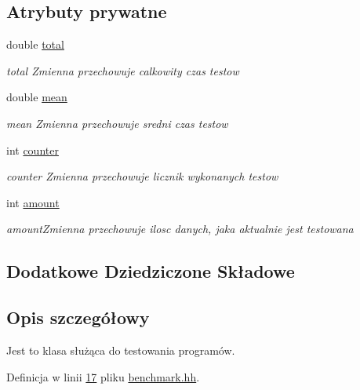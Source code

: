 \subsection*{Atrybuty prywatne}
\begin{DoxyCompactItemize}
\item 
double \hyperlink{class_benchmark_a7130c0718e3a3ab2fea70285dab122a2}{total}
\begin{DoxyCompactList}\small\item\em total Zmienna przechowuje calkowity czas testow \end{DoxyCompactList}\item 
double \hyperlink{class_benchmark_aa88092b6164ad7d1243162d3012f729a}{mean}
\begin{DoxyCompactList}\small\item\em mean Zmienna przechowuje sredni czas testow \end{DoxyCompactList}\item 
int \hyperlink{class_benchmark_a3a56c7dad0b21e490f3024d5d0027f31}{counter}
\begin{DoxyCompactList}\small\item\em counter Zmienna przechowuje licznik wykonanych testow \end{DoxyCompactList}\item 
int \hyperlink{class_benchmark_a1d0eaa6febe9b7a7f5f5147e83f60910}{amount}
\begin{DoxyCompactList}\small\item\em amount\-Zmienna przechowuje ilosc danych, jaka aktualnie jest testowana \end{DoxyCompactList}\end{DoxyCompactItemize}
\subsection*{Dodatkowe Dziedziczone Składowe}


\subsection{Opis szczegółowy}
Jest to klasa służąca do testowania programów. 

Definicja w linii \hyperlink{benchmark_8hh_source_l00017}{17} pliku \hyperlink{benchmark_8hh_source}{benchmark.\-hh}.



